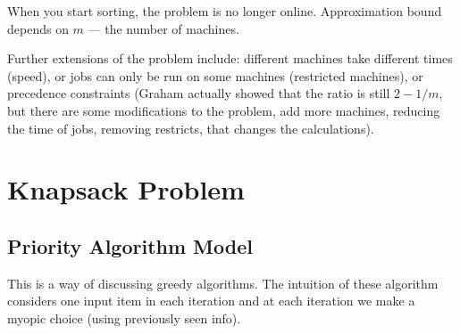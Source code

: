 \documentclass[twoside]{article}
\begin{document}
When you start sorting, the problem is no longer online. Approximation bound depends on $m$ --- the number of machines. 

Further extensions of the problem include: different machines take different times (speed), or jobs can only be run on some machines (restricted machines), or precedence constraints (Graham actually showed that the ratio is still $2 - 1/m$, but there are some modifications to the problem, add more machines, reducing the time of jobs, removing restricts, that changes the calculations).

\section{Knapsack Problem}

\subsection{Priority Algorithm Model}
This is a way of discussing greedy algorithms. The intuition of these algorithm   considers one input item in each iteration and at each iteration we make a myopic choice (using previously seen info).     
\end{document}
